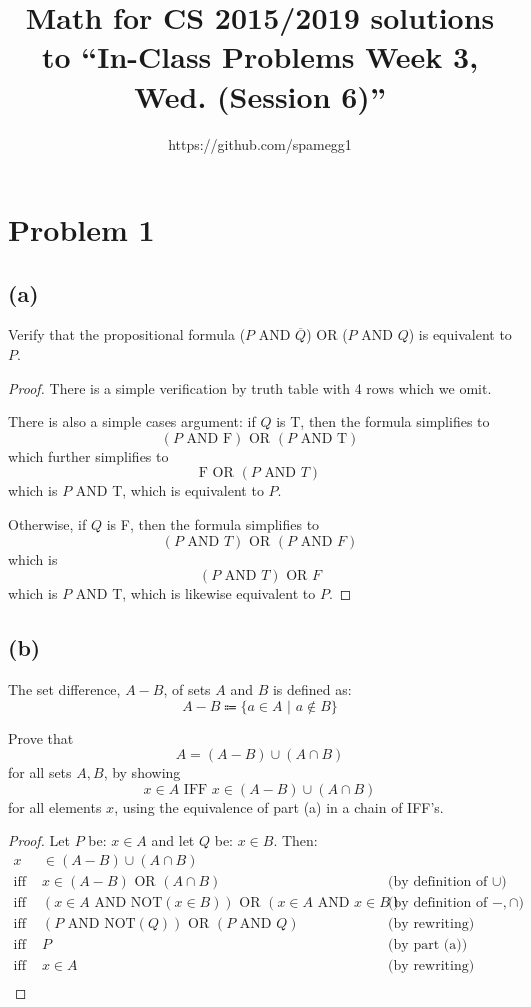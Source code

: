 \documentclass[14pt]{extarticle}
\title{Math for CS 2015/2019 solutions to ``In-Class Problems Week 3, Wed. (Session 6)''}
\author{https://github.com/spamegg1}
\begin{document}
\maketitle
\tableofcontents

\section{Problem 1}
\subsection{(a)}
Verify that the propositional formula ($P$ AND $\overline{Q}$) OR ($P$ AND $Q$) is equivalent to $P$.
\begin{proof}
There is a simple verification by truth table with 4 rows which we omit.

There is also a simple cases argument: if $Q$ is T, then the formula simplifies to 
$$
(P \text{ AND F}) \text{ OR } (P \text{ AND T})
$$
which further simplifies to 
$$
\text{F OR } (P \text{ AND } T)
$$
which is $P$ AND T, which is equivalent to $P$.

Otherwise, if $Q$ is F, then the formula simplifies to 
$$
(P \text{ AND } T) \text{ OR } (P \text{ AND } F)
$$ 
which is 
$$
(P \text{ AND } T) \text{ OR } F
$$
which is $P$ AND T, which is likewise equivalent to $P$.
\end{proof}

\subsection{(b)}
The set difference, $A - B$, of sets $A$ and $B$ is defined as:
$$
A - B \Coloneqq \{a \in A \,\, | \,\, a \notin B\}
$$

Prove that
$$
A = (A - B) \cup (A \cap B)
$$
for all sets $A, B$, by showing
$$
x \in A \text{ IFF } x \in (A - B) \cup (A \cap B)
$$
for all elements $x$, using the equivalence of part (a) in a chain of IFF’s.
\begin{proof}
Let $P$ be: $x \in A$ and let $Q$ be: $x \in B$. Then:
\begin{align*}
x & \in (A - B) \cup (A \cap B) &  & \\
\text{iff } & x \in (A - B) \text{ OR } (A \cap B) & \text{(by definition of } \cup)\\
\text{iff } & (x \in A \text{ AND NOT}(x \in B)) \text{ OR } (x \in A \text{ AND } x \in B) & \text{(by definition of } -, \cap) \\
\text{iff } & (P \text{ AND NOT}(Q)) \text{ OR } (P \text{ AND } Q) & \text{(by rewriting)} \\
\text{iff } & P & \text{(by part (a))} \\
\text{iff } & x \in A & \text{(by rewriting)} \\
\end{align*}
\end{proof}
\end{document}
